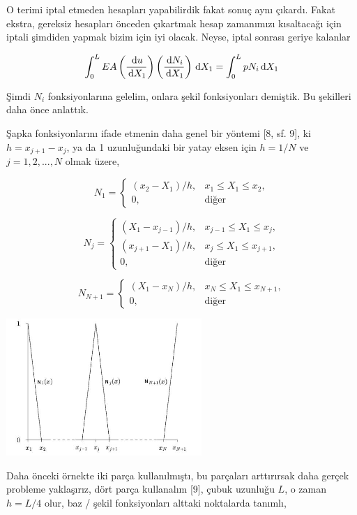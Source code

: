 \documentclass[12pt,fleqn]{article}\usepackage{../../common}
\begin{document}
O terimi iptal etmeden hesapları yapabilirdik fakat sonuç aynı çıkardı. Fakat
ekstra, gereksiz hesapları önceden çıkartmak hesap zamanımızı kısaltacağı için
iptali şimdiden yapmak bizim için iyi olacak. Neyse, iptal sonrası geriye
kalanlar

$$
\int_{0}^{L} EA
\left( \frac{\,\mathrm{d} u}{\,\mathrm{d} X_1} \right)
\left( \frac{\,\mathrm{d} N_i}{\,\mathrm{d} X_1} \right) \,\mathrm{d} X_1
= \int_{0}^{L} p N_i \,\mathrm{d} X_1 
$$

Şimdi $N_i$ fonksiyonlarına gelelim, onlara şekil fonksiyonları demiştik.  Bu
şekilleri daha önce anlattık.

Şapka fonksiyonlarını ifade etmenin daha genel bir yöntemi [8, sf. 9], ki $h =
x_{j+1}-x_j$, ya da 1 uzunluğundaki bir yatay eksen için $h = 1/N$ ve $j =
1,2,...,N$ olmak üzere,

$$
N_1 = \left\{ \begin{array}{rr}
(x_2 - X_1)/h, & x_1 \le X_1 \le x_2,\\
0, & \textrm{diğer}
\end{array} \right.
$$

$$
N_j = \left\{ \begin{array}{rr}
(X_1 - x_{j-1})/h, & x_{j-1} \le X_1 \le x_j,\\
(x_{j+1} - X_1)/h, & x_j \le X_1 \le x_{j+1},\\
0, & \textrm{diğer}
\end{array} \right.
$$

$$
N_{N+1} = \left\{ \begin{array}{rr}
(X_1 - x_N)/h, & x_N \le X_1 \le x_{N+1},\\
0, & \textrm{diğer}
\end{array} \right.
$$

\includegraphics[width=20em]{compscieng_bpp45fem2_09.jpg}

Daha önceki örnekte iki parça kullanılmıştı, bu parçaları arttırırsak daha
gerçek probleme yaklaşırız, dört parça kullanalım [9], çubuk uzunluğu $L$,
o zaman $h = L/4$ olur, baz / şekil fonksiyonları alttaki noktalarda tanımlı,
\end{document}

